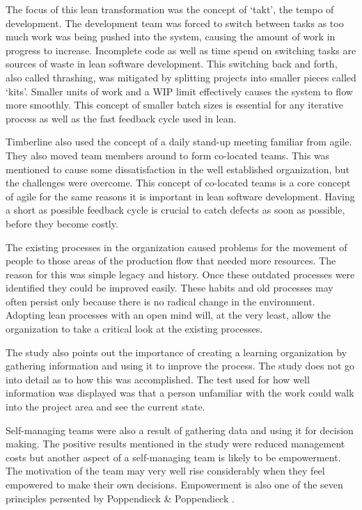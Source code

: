 The focus of this lean transformation was the concept of `takt', the tempo of development. The development team was forced to switch between tasks as too much work was being pushed into the system, causing the amount of work in progress to increase. Incomplete code as well as time spend on switching tasks are sources of waste in lean software development. This switching back and forth, also called thrashing, was mitigated by splitting projects into smaller pieces called `kits'. Smaller units of work and a WIP limit effectively causes the system to flow more smoothly.\cite{Middleton2005Lean} This concept of smaller batch sizes is essential for any iterative process as well as the fast feedback cycle used in lean.

Timberline also used the concept of a daily stand-up meeting familiar from agile. They also moved team members around to form co-located teams. This was mentioned to cause some dissatisfaction in the well established organization, but the challenges were overcome.\cite{Middleton2005Lean} This concept of co-located teams is a core concept of agile for the same reasons it is important in lean software development. Having a short as possible feedback cycle is crucial to catch defects as soon as possible, before they become costly.

The existing processes in the organization caused problems for the movement of people to those areas of the production flow that needed more resources. The reason for this was simple legacy and history. Once these outdated processes were identified they could be improved easily.\cite{Middleton2005Lean} These habits and old processes may often persist only because there is no radical change in the environment. Adopting lean processes with an open mind will, at the very least, allow the organization to take a critical look at the existing processes.

The study also points out the importance of creating a learning organization by gathering information and using it to improve the process. The study does not go into detail as to how this was accomplished. The test used for how well information was displayed was that a person unfamiliar with the work could walk into the project area and see the current state.\cite{Middleton2005Lean}

Self-managing teams were also a result of gathering data and using it for decision making. The positive results mentioned in the study were reduced management costs\cite{Middleton2005Lean} but another aspect of a self-managing team is likely to be empowerment. The motivation of the team may very well rise considerably when they feel empowered to make their own decisions. Empowerment is also one of the seven principles persented by Poppendieck \& Poppendieck \cite{poppendieck2003lean}.

